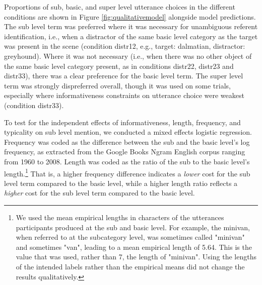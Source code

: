 \documentclass[10pt,letterpaper]{article}
\newcommand{\figref}[1]{Figure \ref{#1}}
\begin{document}
Proportions of sub, basic, and super level utterance choices in the different conditions are shown in \figref{fig:qualitativemodel} alongside model predictions. The sub level term was preferred where it was necessary for unambiguous referent identification, i.e., when a distractor of the same basic level category as the target was present in the scene (condition distr12, e.g., target: dalmatian, distractor: greyhound). Where it was not necessary (i.e., when there was no other object of the same basic level category present, as in conditions distr22, distr23 and distr33), there was a clear preference for the basic level term. The super level term was strongly dispreferred overall, though it was used on some trials, especially where informativeness constraints on utterance choice were weakest (condition distr33). 
%

To test for the independent effects of informativeness, length, frequency, and typicality on sub level mention, we conducted a mixed effects logistic regression. Frequency was coded as the difference between the sub and the basic level's log frequency, as extracted from the Google Books Ngram English corpus ranging from 1960 to 2008. Length was coded as the ratio of the sub to the basic level's length.\footnote{We used the mean empirical lengths in characters of the utterances participants produced at the sub and basic level. For example, the minivan, when referred to at the subcategory level, was sometimes called "minivan" and sometimes "van", leading to a mean empirical length of 5.64. This is the value that was used, rather than 7, the length of "minivan". Using the lengths of the intended labels rather than the empirical means did not change the results qualitatively.} That is, a higher frequency difference indicates a \emph{lower} cost for the sub level term compared to the basic level, while a higher length ratio reflects a \emph{higher} cost for the sub level term compared to the basic level. 
\end{document}
